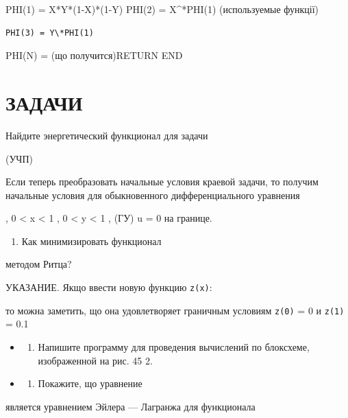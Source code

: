 \documentclass[
  ukrainian,
]{article}
\providecommand{\tightlist}{%
  \setlength{\itemsep}{0pt}\setlength{\parskip}{0pt}}
\begin{document}
PHI(1) = X*Y*(1-X)*(1-Y) PHI(2) = X\^{}*PHI(1) (используемые функції)

\begin{verbatim}
PHI(3) = Y\*PHI(1)
\end{verbatim}

PHI(N) = (що получится)RETURN END

\section{\texorpdfstring{\textbf{ЗА}ДАЧИ}{ЗАДАЧИ}}\label{ux437ux430ux434ux430ux447ux438-12}

Найдите энергетический функционал для задачи

(УЧП)

Если теперь преобразовать начальные условия краевой задачи, то получим
начальные условия для обыкновенного дифференциального уравнения

, 0 \textless{} x \textless{} 1 , 0 \textless{} y \textless{} 1 , (ГУ) u
= 0 на границе.

\begin{enumerate}
\def\labelenumi{\arabic{enumi}.}
\setcounter{enumi}{1}
\tightlist
\item
  Как минимизировать функционал
\end{enumerate}

методом Ритца?

УКАЗАНИЕ. Якщо ввести новую функцию \texttt{z(x)}:

то можна заметить, що она удовлетворяет граничным условиям \texttt{z(0)}
= 0 и \texttt{z(1)} = 0.1

\begin{itemize}
\tightlist
\item
  \begin{enumerate}
  \def\labelenumi{\arabic{enumi}.}
  \setcounter{enumi}{2}
  \tightlist
  \item
    Напишите программу для проведения вычислений по блоксхеме,
    изображенной на рис. 45 2.
  \end{enumerate}
\item
  \begin{enumerate}
  \def\labelenumi{\arabic{enumi}.}
  \setcounter{enumi}{3}
  \tightlist
  \item
    Покажите, що уравнение
  \end{enumerate}
\end{itemize}

является уравнением Эйлера --- Лагранжа для функционала
\end{document}
